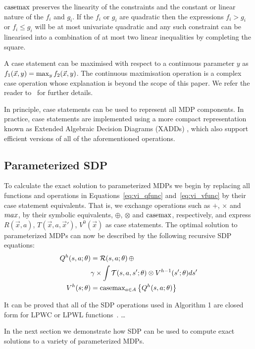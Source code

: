 $\mathrm{casemax}$ preserves the linearity of the constraints and the constant 
or linear nature of the $f_i$ and $g_i$. If the $f_i$ or 
$g_i$ are quadratic then the expressions $f_i > g_i$ or 
$f_i \leq g_i$ will be at most univariate quadratic and any such 
constraint can be linearised into a combination of at most two linear 
inequalities by completing the square. 

A case statement can be maximised with respect to a continuous parameter $y$ as {\small $ f_1(\vec{x}, y) = \contmax_{y}f_2(\vec{x}, y) $}. The continuous maximisation operation is a complex case operation whose explanation is beyond the scope of this paper. We refer the reader to~\parencite{Zamani_AAAI_2012} for further details.

In principle, case statements can be used to represent all MDP components. In practice, case statements are implemented using a more compact representation known as Extended Algebraic Decision Diagrams (XADDs) \parencite{Sanner_UAI_2011}, which also support efficient versions of all of the aforementioned operations.

\subsection{Parameterized SDP}

To calculate the exact solution to parameterized MDPs we begin by replacing all functions and operations in Equations~\eqref{eq:vi_qfunc} and~\eqref{eq:vi_vfunc} by their case statement equivalents. That is, we exchange operations such as $+$, $\times$ and $\mathnormal{max}$, by their symbolic equivalents, $\oplus$, $\otimes$ and $\mathrm{casemax}$, respectively, and express {\small $R(\vec{x}, a)$},  {\small $T(\vec{x}, a, \vec{x}')$}, {\small $V^0(\vec{x})$} as case statements. The optimal solution to parameterized MDPs can now be described by the following recursive SDP equations:
{\footnotesize 
    \abovedisplayskip=0pt
    \belowdisplayskip=0pt
    \begin{align}
        Q^{h}(s, a; \theta) &= \mathcal{R}(s, a; \theta) \, \oplus \nonumber \\
        & \gamma \times \int \mathcal{T}(s, a, s'; \theta) \otimes V^{h-1}(s'; \theta) ds'\label{eq:qfunc}\\
        V^{h}(s; \theta) &= \mathrm{casemax}_{a \in A} \left\{ Q^{h}(s, a; \theta) \right\} \label{eq:vfunc}
    \end{align}
}%

It can be proved that all of the SDP operations used in Algorithm 1 are closed form for LPWC or LPWL functions~\parencite{Sanner_UAI_2011,Zamani_AAAI_2012}. \ldots

In the next section we demonstrate how SDP can be used to compute exact solutions to a variety of parameterized MDPs.
